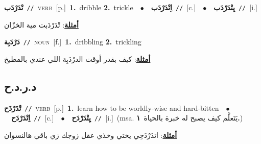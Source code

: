 \documentclass[10pt,a4paper,twoside]{article} %
\begin{document}
\begin{multicols}{2}
{\setlength\topsep{0pt}\textbf{\foreignlanguage{arabic}{تْدَرْدَب}}\ {\color{gray}\texttt{//}\color{black}}\ \textsc{verb}\ [p.]\ \textbf{1.}~dribble  \textbf{2.}~trickle\ \ $\bullet$\ \ \setlength\topsep{0pt}\textbf{\foreignlanguage{arabic}{اِتْدَرْدَب}}\ {\color{gray}\texttt{//}\color{black}}\ [c.]\ \ $\bullet$\ \ \setlength\topsep{0pt}\textbf{\foreignlanguage{arabic}{يِتْدَرْدَب}}\ {\color{gray}\texttt{//}\color{black}}\ [i.]\  \begin{flushright}\color{gray}\foreignlanguage{arabic}{\textbf{\underline{\foreignlanguage{arabic}{أمثلة}}}: تْدَرْدَبت مية الخزّان}\end{flushright}\color{black}} \vspace{2mm}

{\setlength\topsep{0pt}\textbf{\foreignlanguage{arabic}{دَرْدَبِة}}\ {\color{gray}\texttt{//}\color{black}}\ \textsc{noun}\ [f.]\ \textbf{1.}~dribbling  \textbf{2.}~trickling\  \begin{flushright}\color{gray}\foreignlanguage{arabic}{\textbf{\underline{\foreignlanguage{arabic}{أمثلة}}}: كيف بقدر أوقت الدرْدَبِة اللي عندي بالمطبخ}\end{flushright}\color{black}} \vspace{2mm}

\vspace{-3mm}
\subsection*{\color{blue}\foreignlanguage{arabic}{د.ر.د.ح}\color{blue}{}} 

{\setlength\topsep{0pt}\textbf{\foreignlanguage{arabic}{تْدَرْدَح}}\ {\color{gray}\texttt{//}\color{black}}\ \textsc{verb}\ [p.]\ \textbf{1.}~learn how to be worldly-wise and hard-bitten\ \ $\bullet$\ \ \setlength\topsep{0pt}\textbf{\foreignlanguage{arabic}{اِتْدَرْدَح}}\ {\color{gray}\texttt{//}\color{black}}\ [c.]\ \ $\bullet$\ \ \setlength\topsep{0pt}\textbf{\foreignlanguage{arabic}{يِتْدَرْدَح}}\ {\color{gray}\texttt{//}\color{black}}\ [i.]\ \color{gray}(msa. \foreignlanguage{arabic}{يَتَعلَّم كيف يصبح له خبرة بالحياة}~\foreignlanguage{arabic}{\textbf{١.}})\color{black}\  \begin{flushright}\color{gray}\foreignlanguage{arabic}{\textbf{\underline{\foreignlanguage{arabic}{أمثلة}}}: اتدَرْدَحِي يختي وخذي عقل زوجك زي باقي هالنسوان}\end{flushright}\color{black}} \vspace{2mm}


\end{multicols}
\end{document}
